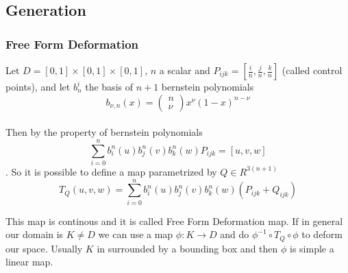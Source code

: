 \documentclass{article}
\begin{document}
\subsection{Generation}
\subsubsection{Free Form Deformation}
Let $D=[0,1]\times[0,1]\times[0,1]$, $n$ a scalar and $P_{ijk}=\left[\frac{i}{n},\frac{j}{n},\frac{k}{n}\right]$ (called control points), and let $b^{i}_{n}$ the basis of $n+1$ bernstein polynomials
$$b_{\nu, n}(x)=\left(\begin{array}{l}
n \\
\nu
\end{array}\right) x^\nu(1-x)^{n-\nu}$$\\
Then by the property of bernstein polynomials
$$\sum_{i=0}^{n}b_{i}^{n}(u)b_{j}^{n}(v)b_{k}^{n}(w)P_{ijk}=\left[u,v,w\right]$$.
So it is possible to define a map parametrized by $Q\in R^{3(n+1)}$
$$T_{Q}(u,v,w)=\sum_{i=0}^{n}b_{i}^{n}(u)b_{j}^{n}(v)b_{k}^{n}(w)(P_{ijk}+Q_{ijk})$$

This map is continous and it is called Free Form Deformation map.
If in general our domain is $K\neq D$ we can use a map $\phi: K \rightarrow D$ and do $\phi^{-1}\circ T_{Q} \circ \phi$ to deform our space. Usually $K$ in surrounded by a bounding box and then $\phi$ is simple a linear map. 
\end{document}
